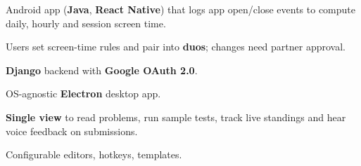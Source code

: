 \documentclass[]{plushcv}
\begin{document}
\begin{minipage}[t]{0.39\textwidth}
\vspace{\dimexpr\topsep-2pt\relax} %
\begin{tightemize}
\item Android app (\textbf{Java}, \textbf{React Native}) that logs app open/close events to compute daily, hourly and session screen time.
\item Users set screen-time rules and pair into \textbf{duos}; changes need partner approval.
\item \textbf{Django} backend with \textbf{Google OAuth 2.0}.
\end{tightemize}
\sectionsep
{}
\vspace{\dimexpr\topsep-2pt\relax} %
\begin{tightemize}
\item OS-agnostic \textbf{Electron} desktop app.
\item \textbf{Single view} to read problems, run sample tests, track live standings and hear voice feedback on submissions.
\item Configurable editors, hotkeys, templates.
\end{tightemize}
\sectionsep






\end{minipage} 
\end{document}
